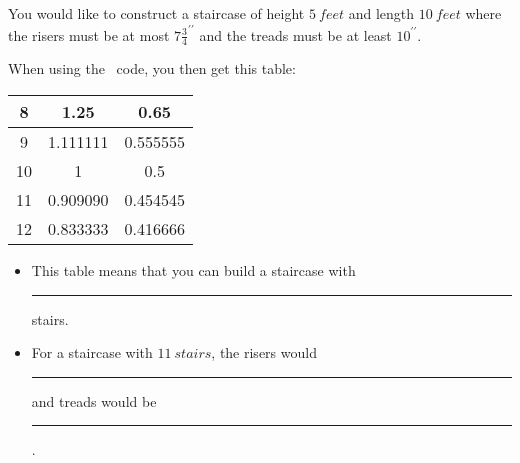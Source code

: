 \documentclass{ximera}
\begin{document}
\begin{exercise}
 You would like to construct a staircase of height $5\ feet$ and length $10\ feet$ where the risers must be at most $7\frac{3}{4}^{\prime\prime}$ and the treads must be at least $10^{\prime\prime}$. 
 
 

 
When using the \snap\ code, you then get this table:

\begin{tabular}{|c|c|c|}\hline
8&1.25& 0.65\\\hline
9& 1.111111& 0.555555 \\\hline
10 & 1 & 0.5\\\hline
11 & 0.909090 & 0.454545\\\hline
12&0.833333&0.416666\\\hline
\end{tabular}

\begin{itemize}
 \item This table means that you can build a staircase with \rule{2cm}{0.4pt} stairs.
 \item For a staircase with $11\ stairs$, the risers would \rule{2cm}{0.4pt} and treads would be \rule{2cm}{0.4pt}.
\end{itemize}
\end{exercise}
\vfill
{}
\end{document}
